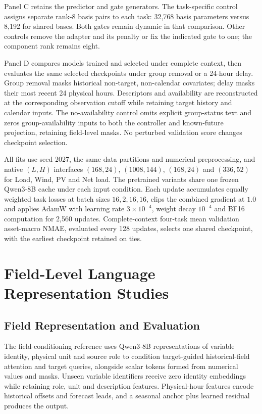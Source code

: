 \documentclass[journal]{IEEEtran}
\begin{document}
Panel C retains the predictor and gate generators. The task-specific control assigns separate rank-8 basis pairs to each task: 32,768 basis parameters versus 8,192 for shared bases. Both gates remain dynamic in that comparison. Other controls remove the adapter and its penalty or fix the indicated gate to one; the component rank remains eight.

Panel D compares models trained and selected under complete context, then evaluates the same selected checkpoints under group removal or a 24-hour delay. Group removal masks historical non-target, non-calendar covariates; delay masks their most recent 24 physical hours. Descriptors and availability are reconstructed at the corresponding observation cutoff while retaining target history and calendar inputs. The no-availability control omits explicit group-status text and zeros group-availability inputs to both the controller and known-future projection, retaining field-level masks. No perturbed validation score changes checkpoint selection.

All fits use seed 2027, the same data partitions and numerical preprocessing, and native $(L,H)$ interfaces $(168,24)$, $(1008,144)$, $(168,24)$ and $(336,52)$ for Load, Wind, PV and Net load. The pretrained variants share one frozen Qwen3-8B cache under each input condition. Each update accumulates equally weighted task losses at batch sizes $16,2,16,16$, clips the combined gradient at $1.0$ and applies AdamW with learning rate $3\times10^{-4}$, weight decay $10^{-4}$ and BF16 computation for 2,560 updates. Complete-context four-task mean validation asset-macro NMAE, evaluated every 128 updates, selects one shared checkpoint, with the earliest checkpoint retained on ties.

\section{Field-Level Language Representation Studies}
\label{sec:language_studies}

\subsection{Field Representation and Evaluation}

The field-conditioning reference uses Qwen3-8B representations of variable identity, physical unit and source role to condition target-guided historical-field attention and target queries, alongside scalar tokens formed from numerical values and masks. Unseen variable identifiers receive zero identity embeddings while retaining role, unit and description features. Physical-hour features encode historical offsets and forecast leads, and a seasonal anchor plus learned residual produces the output.
\end{document}
